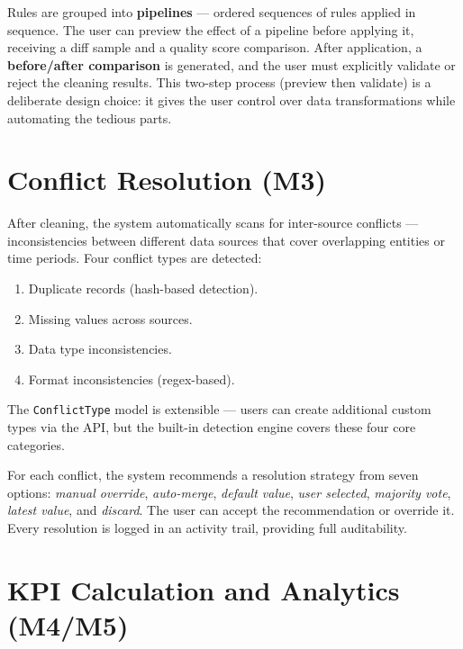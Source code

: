 \noindent
Rules are grouped into \textbf{pipelines} —
ordered sequences of rules applied in sequence.
The user can preview the effect of a pipeline
before applying it, receiving a diff sample
and a quality score comparison.
After application, a \textbf{before/after comparison}
is generated, and the user must explicitly
validate or reject the cleaning results.
This two-step process (preview then validate)
is a deliberate design choice:
it gives the user control over data transformations
while automating the tedious parts.


\section{Conflict Resolution (M3)}

\noindent
After cleaning, the system automatically
scans for inter-source conflicts —
inconsistencies between different data sources
that cover overlapping entities or time periods.
Four conflict types are detected:

\begin{enumerate}
  \item Duplicate records (hash-based detection).
  \item Missing values across sources.
  \item Data type inconsistencies.
  \item Format inconsistencies (regex-based).
\end{enumerate}

\noindent
The \texttt{ConflictType} model is extensible —
users can create additional custom types
via the API, but the built-in detection engine
covers these four core categories.

\noindent
For each conflict, the system recommends
a resolution strategy from seven options:
\textit{manual override}, \textit{auto-merge},
\textit{default value}, \textit{user selected},
\textit{majority vote}, \textit{latest value},
and \textit{discard}.
The user can accept the recommendation
or override it.
Every resolution is logged in an activity trail,
providing full auditability.


\section{KPI Calculation and Analytics (M4/M5)}

